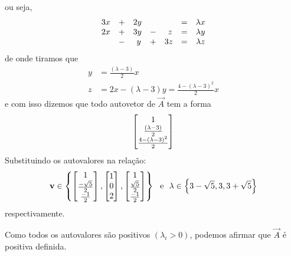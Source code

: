 \documentclass{homework}
\begin{document}
		ou seja,
			\begin{align*}
			\begin{array}{@{}ccccccc@{}}
			3x&+&2y&~&~~&=&\lambda x\\
			2x&+&3y&-&~z&=&\lambda y\\
			~~&-&~y&+&3z&=&\lambda z
			\end{array}
			\end{align*}
		de onde tiramos que
			\begin{align*}
				y &= \frac{(\lambda - 3)}{2} x\\
				z &= 2x -(\lambda - 3) y = \frac{4 - (\lambda - 3)^2}{2} x
			\end{align*}
		e com isso dizemos que todo autovetor de $\vec{A}$ tem a forma
			\begin{align*}
				\left[\begin{array}{@{}c@{}}
				1 \\
				\frac{(\lambda - 3)}{2} \\
				\frac{4 - (\lambda - 3)^2}{2}
				\end{array}\right]
			\end{align*}
		Substituindo os autovalores na relação:
			\begin{align*}
			\vec{v} \in \left\{\left[\begin{array}{@{}c@{}}
			1 \\
			\frac{-\sqrt{5}}{2} \\
			\frac{-1}{2}
			\end{array}\right],
			\left[\begin{array}{@{}c@{}}
			1 \\
			0 \\
			2
			\end{array}\right],
			\left[\begin{array}{@{}c@{}}
			1 \\
			\frac{\sqrt{5}}{2} \\
			\frac{-1}{2}
			\end{array}\right]
			\right\}~\text{ e }~
			\lambda \in \left\{3 - \sqrt{5}, 3, 3 + \sqrt{5}\right\}
			\end{align*}
		respectivamente.
		
		
		\subsubquest Como todos os autovalores são positivos $(\lambda_i > 0)$, podemos afirmar que $\vec{A}$ é positiva definida.
		
\end{document}
